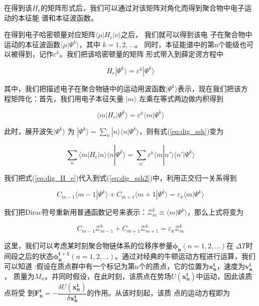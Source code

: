 \documentclass[12pt,]{report}
\begin{document}
\noindent
在得到该\(H_e\)的矩阵形式后，我们可以通过对该矩阵对角化而得到聚合物中电子运动的本征能
谱和本征波函数。

在得到电子哈密顿量对应矩阵\(\langle \mu | H_e | \nu \rangle\)之后，
我们就可以得到该电
子在聚合物中运动的本征波函数\(\langle \mu | \Psi^k \rangle\)，其中
\(k = 1, 2, ...\)。
同时，本征能谱中的第n个能级也可以被得到，记作\(\varepsilon^k\)。我们把该哈密顿量的矩阵
形式带入到薛定谔方程中

\begin{equation}
H_e | \Psi^k \rangle = \varepsilon^k | \Psi^k \rangle
\end{equation}

\noindent
其中，我们把描述电子在聚合物链中的运动用波函数\(| \Psi^k \rangle\)表示，现在我们把该方
程矩阵化：首先，我们用电子本征矢量 \(| m\rangle\)
左乘在等式两边做内积得到

\begin{equation} \label{eq:dig_ssh}
\langle m | H_e | \Psi^k \rangle = \varepsilon^k \langle m | \Psi^k \rangle
\end{equation}

\noindent
此时，展开波矢\(| \Psi^k \rangle\) 为
\(| \Psi^k \rangle = \sum\limits_n |n \rangle \langle n | \Psi^k \rangle\)，则有式(\ref{eq:dig_ssh})变为

\begin{equation} \label{eq:dig_ssh2}
\sum\limits_n \langle m | H_e | n \rangle \langle n | \Psi^k \rangle =
\sum\limits_{n'} \varepsilon^k \langle m | n' \rangle \langle n' | \Psi^k \rangle
\end{equation}

\noindent
我们把式(\ref{eq:dig_H_e})代入到式(\ref{eq:dig_ssh2})中，利用正交归一关系得到

\begin{equation} 
C_{m-1} \langle m - 1 | \Psi^k \rangle + C_{m+1} \langle m + 1 | \Psi^k \rangle = 
\varepsilon_k \langle m | \Psi^k \rangle
\end{equation}

\noindent
我们把Dirac符号重新用普通函数记号来表示：\(\mathcal{Z}_m^k \equiv \langle m | \Psi^k \rangle\)，那么上式将变为

\begin{equation} \label{eq:dig_ssh3}
C_{m-1} \mathcal{Z}_{m-1}^k + C_{m+1} \mathcal{Z}_{m+1}^k = \varepsilon_k
\mathcal{Z}_m^k
\end{equation}

这里，我们可以考虑某时刻聚合物链体系的位移序参量\(\bm{\phi_n} (n = 1, 2, ...)\)在
\(\Delta T\)时间段之后的状态\(\bm{\phi_n^{t+1}} (n = 1, 2, ...)\)。通过对经典的牛顿运动方程进行运算，我们可以知道
:假设在质点群中有一个标记为第n个的质点，它的位置为\(\bm{x_n^t}\)，速度为\(\bm{v_n^t}\)，
质量为\(M_n\)。并同时假设，在此时刻，该质点在势场\(U(\bm{x_n^t})\)中运动，因此该质点将受
到\(\bm{F_n^t} = - \dfrac{\delta U(\bm{x_n^t})}{\delta \bm{x_n^t}}\)的作用。从该时刻起，该质
点的运动方程即为
\end{document}
